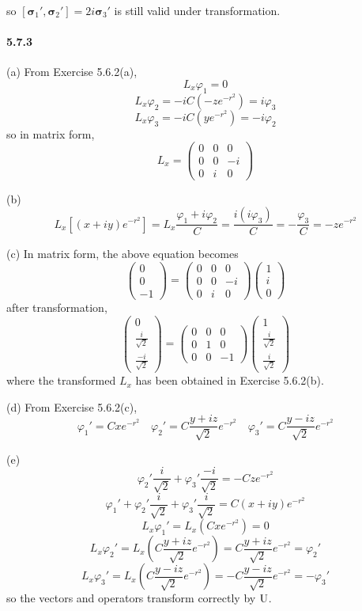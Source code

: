 \documentclass[a4paper]{article}
\begin{document}
so $[\boldsymbol{\sigma}_1',\boldsymbol{\sigma}_2']=2i\boldsymbol{\sigma}_3'$ is still valid under transformation.

\paragraph{5.7.3}
(a) From Exercise 5.6.2(a), 
\[
L_x\varphi_1=0
\]
\[
L_x\varphi_2=-iC(-ze^{-r^2})=i\varphi_3
\]
\[
L_x\varphi_3=-iC(ye^{-r^2})=-i\varphi_2
\]
so in matrix form,
\[
L_x=
\begin{pmatrix}
0&0&0\\
0&0&-i\\
0&i&0
\end{pmatrix}
\]

(b) 
\[
L_x\left[(x+iy)e^{-r^2} \right]=L_x\frac{\varphi_1+i\varphi_2}{C}=\frac{i(i\varphi_3)}{C}=-\frac{\varphi_3}{C}=-ze^{-r^2}
\]

(c) 
In matrix form, the above equation becomes
\[
\begin{pmatrix}
0\\0\\-1
\end{pmatrix}=
\begin{pmatrix}
0&0&0\\
0&0&-i\\
0&i&0
\end{pmatrix}
\begin{pmatrix}
1\\i\\0
\end{pmatrix}
\]
after transformation,
\[
\begin{pmatrix}
0\\\frac{i}{\sqrt{2}}\\\frac{-i}{\sqrt{2}}
\end{pmatrix}=
\begin{pmatrix}
0&0&0\\
0&1&0\\
0&0&-1
\end{pmatrix}
\begin{pmatrix}
1\\\frac{i}{\sqrt{2}}\\\frac{i}{\sqrt{2}}
\end{pmatrix}
\]
where the transformed $L_x$ has been obtained in Exercise 5.6.2(b).

(d) From Exercise 5.6.2(c), 
\[
\varphi_1'=Cxe^{-r^2}\quad\varphi_2'=C\frac{y+iz}{\sqrt{2}}e^{-r^2}\quad\varphi_3'=C\frac{y-iz}{\sqrt{2}}e^{-r^2}
\]

(e) 
\[
\varphi_2'\frac{i}{\sqrt{2}}+\varphi_3'\frac{-i}{\sqrt{2}}=-Cze^{-r^2}
\]
\[
\varphi_1'+\varphi_2'\frac{i}{\sqrt{2}}+\varphi_3'\frac{i}{\sqrt{2}}=C(x+iy)e^{-r^2}
\]
\[
L_x\varphi_1'=L_x(Cxe^{-r^2})=0
\]
\[L_x\varphi_2'=L_x(C\frac{y+iz}{\sqrt{2}}e^{-r^2})=C\frac{y+iz}{\sqrt{2}}e^{-r^2}=\varphi_2'
\] 
\[
L_x\varphi_3'=L_x(C\frac{y-iz}{\sqrt{2}}e^{-r^2})
=-C\frac{y-iz}{\sqrt{2}}e^{-r^2}=-\varphi_3'
\]
so the vectors and operators transform correctly by $\mathrm{U}$.
\end{document}
